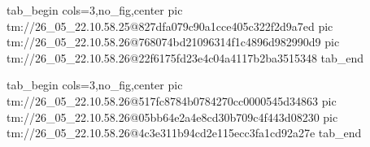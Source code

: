  
 
 
 
 

\qqSecCmtScr


\ifcmt
  tab_begin cols=3,no_fig,center
    pic tm://26_05_22.10.58.25@827dfa079c90a1cce405c322f2d9a7ed
    pic tm://26_05_22.10.58.26@768074bd21096314f1c4896d982990d9
    pic tm://26_05_22.10.58.26@22f6175fd23e4c04a4117b2ba3515348
  tab_end
\fi


\ifcmt
  tab_begin cols=3,no_fig,center
    pic tm://26_05_22.10.58.26@517fc8784b0784270cc0000545d34863
    pic tm://26_05_22.10.58.26@05bb64e2a4e8cd30b709c4f443d08230
    pic tm://26_05_22.10.58.26@4c3e311b94cd2e115ecc3fa1cd92a27e
  tab_end
\fi

